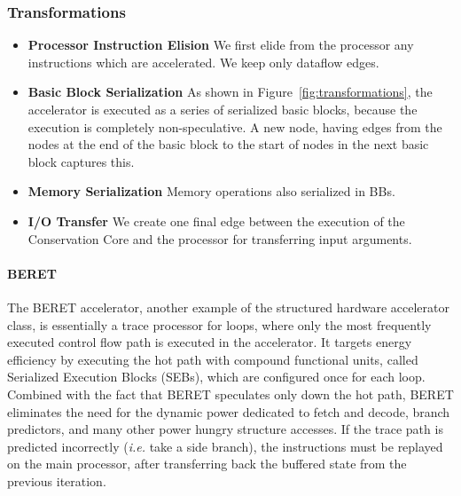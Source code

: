 \subsubsection*{Transformations}
\begin{itemize}
  \item \textbf{Processor Instruction Elision}  We first elide from the processor any instructions
  which are accelerated.  We keep only dataflow edges.
  \item \textbf{Basic Block Serialization}  As shown in Figure~\ref{fig:transformations},
  the accelerator is executed as a series of serialized basic blocks, because
  the execution is completely non-speculative.  A new node, having edges from
  the nodes at the end of the basic block to the start of nodes in the next basic block
  captures this.
  \item \textbf{Memory Serialization} Memory operations also serialized in BBs.
  \item \textbf{I/O Transfer} We create one final edge between the execution of the Conservation
  Core and the processor for transferring input arguments.
\end{itemize}

  
\paragraph{BERET}

The BERET accelerator, another example of the structured hardware accelerator class,
is essentially a trace processor for loops, where only the most frequently 
executed control flow path is executed in the accelerator.  
It targets energy efficiency by executing the hot path with compound functional 
units, called Serialized Execution Blocks (SEBs), which are configured once for
each loop. Combined with the fact
that BERET speculates only down the hot path, BERET eliminates the need
for the dynamic power dedicated to fetch and decode, branch predictors,
and many other power hungry structure accesses.
If the trace path is predicted incorrectly (\emph{i.e.} take a side branch),
the instructions must be replayed on the main processor, after transferring back the buffered state
from the previous iteration.


